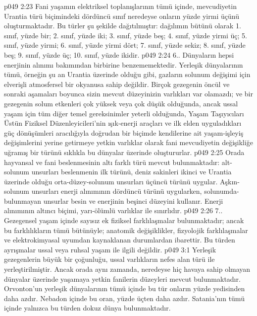 \vs p049 2:23 Fani yaşamın elektriksel toplanışlarının tümü içinde, mevcudiyetin Urantia türü biçimindeki dördüncü sınıf neredeyse onların yüzde yirmi üçünü oluşturmaktadır. Bu türler şu şekilde dağıtılmıştır: dağılımın bütünü olarak 1. sınıf, yüzde bir; 2. sınıf, yüzde iki; 3. sınıf, yüzde beş; 4. sınıf, yüzde yirmi üç; 5. sınıf, yüzde yirmi; 6. sınıf, yüzde yirmi dört; 7. sınıf, yüzde sekiz; 8. sınıf, yüzde beş; 9. sınıf, yüzde üç; 10. sınıf, yüzde ikidir.
\vs p049 2:24 6.\bibnobreakspace {}. Dünyaların hepsi enerjinin alınımı bakımından birbirine benzememektedir. Yerleşik dünyalarının tümü, örneğin şu an Urantia üzerinde olduğu gibi, gazların solunum değişimi için elverişli atmosfersel bir okyanusa sahip değildir. Birçok gezegenin öncül ve sonraki aşamaları boyunca sizin mevcut düzeyinizin varlıkları var olamazdı; ve bir gezegenin solum etkenleri çok yüksek veya çok düşük olduğunda, ancak ussal yaşam için tüm diğer temel gereksinimler yeterli olduğunda, Yaşam Taşıyıcıları Üstün Fiziksel Düzenleyicileri’nin ışık\hyp{}enerji araçları ve ilk elden uyguladıkları güç dönüşümleri aracılığıyla doğrudan bir biçimde kendilerine ait yaşam\hyp{}işleyiş değişimlerini yerine getirmeye yetkin varlıklar olarak fani mevcudiyetin değişikliğe uğramış bir türünü sıklıkla bu dünyalar üzerinde oluştururlar.
\vs p049 2:25 Orada hayvansal ve fani beslenmesinin altı farklı türü mevcut bulunmaktadır: alt\hyp{}solunum unsurları beslenmenin ilk türünü, deniz sakinleri ikinci ve Urantia üzerinde olduğu orta\hyp{}düzey\hyp{}solunum unsurları üçüncü türünü uygular. Aşkın\hyp{}solunum unsurları enerji alınımının dördüncü türünü uygularken, solunumda\hyp{}bulunmayan unsurlar besin ve enerjinin beşinci düzeyini kullanır. Enerji alınımının altıncı biçimi, yarı\hyp{}ölümlü varlıklar ile sınırlıdır.
\vs p049 2:26 7.\bibnobreakspace {}. Gezegensel yaşam içinde sayısız ek fiziksel farklılaşmalar bulunmaktadır; ancak bu farklılıkların tümü bütünüyle; anatomik değişiklikler, fizyolojik farklılaşmalar ve elektrokimyasal uyumdan kaynaklanan durumlardan ibarettir. Bu türden ayrışmalar ussal veya ruhsal yaşam ile ilgili değildir.
\vs p049 3:1 Yerleşik gezegenlerin büyük bir çoğunluğu, ussal varlıkların nefes alan türü ile yerleştirilmiştir. Ancak orada aynı zamanda, neredeyse hiç havaya sahip olmayan dünyalar üzerinde yaşamaya yetkin fanilerin düzeyleri mevcut bulunmaktadır. Orvonton’un yerleşik dünyalarının tümü içinde bu tür onların yüzde yedisinden daha azdır. Nebadon içinde bu oran, yüzde üçten daha azdır. Satania’nın tümü içinde yalnızca bu türden dokuz dünya bulunmaktadır.
